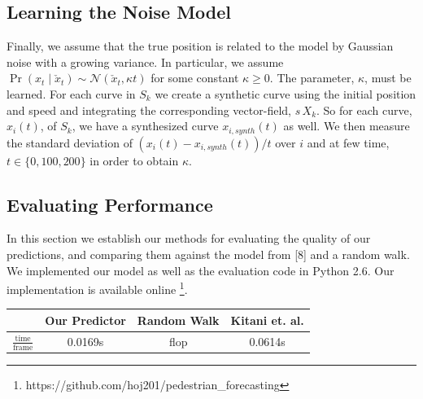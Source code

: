 \documentclass[letterpaper,10pt,conference]{ieeeconf}
\begin{document}
  \subsection{Learning the Noise Model}
  Finally, we assume that the true position is related to the model by Gaussian noise with a growing variance.
  In particular, we assume $\Pr( x_t \mid \check{x}_t) \sim \mathcal{N}( \check{x}_t , \kappa t)$ for some constant $\kappa \geq 0$.
  The parameter, $\kappa$, must be learned.
  For each curve in $S_k$ we create a synthetic curve using the initial position and speed and integrating the corresponding vector-field, $s\, X_k$.
  So for each curve, $x_i(t)$, of $S_k$, we have a synthesized curve $x_{i,synth}(t)$ as well.
  We then measure the standard deviation of $(x_i(t) - x_{i,synth}(t)) / t$ over $i$ and at few time, $t \in \{ 0, 100, 200 \}$ in order to obtain $\kappa$.
  
 \subsection{Evaluating Performance}
In this section we establish our methods for evaluating the quality of our predictions, and comparing them against the model from [8] and a random walk.
We implemented our model as well as the evaluation code in Python 2.6. Our implementation is available online \footnote{https://github.com/hoj201/pedestrian\_forecasting}.
\begin{tabular}{||c | c c  c ||} 
	\hline
	& Our Predictor & Random Walk & Kitani et. al. \\ [0.5ex] 
	\hline 
	$\frac{\mathrm{time}}{\mathrm{frame}}$ & 0.0169s & flop & 0.0614s \\
	\hline
	
\end{tabular}
\end{document}
